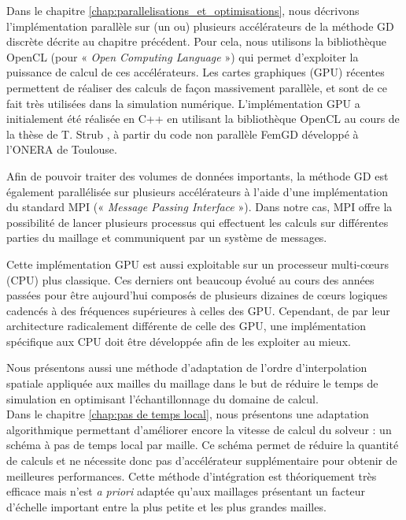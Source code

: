 Dans le chapitre \ref{chap:parallelisations_et_optimisations},
nous décrivons l'implémentation parallèle sur (un ou) plusieurs
accélérateurs de la méthode GD discrète décrite au chapitre précédent.
Pour cela, nous utilisons la bibliothèque OpenCL
(pour « \textit{Open Computing Language} ») qui permet
d'exploiter la puissance de calcul de ces accélérateurs.
Les cartes graphiques (GPU) récentes permettent de réaliser des calculs
de façon massivement parallèle, et sont de ce fait
très utilisées dans la simulation numérique.
L'implémentation GPU a initialement été réalisée en C++ en utilisant la bibliothèque
OpenCL au cours de la thèse de T. Strub \cite{strub:tel-01651258}, à partir du code non parallèle
FemGD développé à l'ONERA de Toulouse.

Afin de pouvoir traiter des volumes de données importants, la méthode GD est
également parallélisée sur plusieurs accélérateurs à l'aide d'une implémentation du standard
MPI (« \textit{Message Passing Interface} »).
Dans notre cas, MPI offre la possibilité de lancer plusieurs
processus qui effectuent les calculs sur différentes parties du maillage
et communiquent par un système de messages.

Cette implémentation GPU est aussi exploitable sur un processeur multi-cœurs
(CPU) plus classique. Ces derniers ont beaucoup évolué au cours des années passées
pour être aujourd'hui composés de plusieurs dizaines de cœurs logiques cadencés
à des fréquences supérieures à celles des GPU. Cependant, de par leur architecture
radicalement différente de celle des GPU, une implémentation spécifique aux CPU doit être
développée afin de les exploiter au mieux.

Nous présentons aussi une méthode d'adaptation de l'ordre d'interpolation
spatiale appliquée aux mailles du maillage dans le but de réduire le temps
de simulation en optimisant l'échantillonnage du domaine de calcul.
\\




Dans le chapitre \ref{chap:pas de temps local}, nous présentons une
adaptation algorithmique permettant d'améliorer encore la vitesse de calcul
du solveur : un schéma à pas de temps local par maille.
Ce schéma permet de réduire la quantité de calculs et ne nécessite
donc pas d'accélérateur supplémentaire pour obtenir de meilleures
performances.
Cette méthode d'intégration est théoriquement très efficace
mais n'est \textit{a priori} adaptée qu'aux maillages présentant un facteur
d'échelle important entre la plus petite et les plus grandes mailles.

